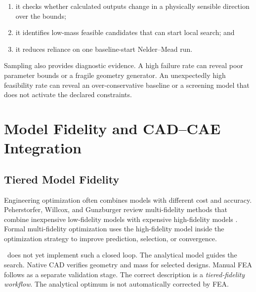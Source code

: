 \begin{enumerate}
    \item it checks whether calculated outputs change in a physically sensible
    direction over the bounds;
    \item it identifies low-mass feasible candidates that can start local
    search; and
    \item it reduces reliance on one baseline-start Nelder--Mead run.
\end{enumerate}

Sampling also provides diagnostic evidence. A high failure rate can reveal
poor parameter bounds or a fragile geometry generator. An unexpectedly high
feasibility rate can reveal an over-conservative baseline or a screening model
that does not activate the declared constraints.

\section{Model Fidelity and CAD--CAE Integration}
\label{sec:model-fidelity-integration}

\subsection{Tiered Model Fidelity}
\label{sec:fidelity-review}

Engineering optimization often combines models with different cost and
accuracy. Peherstorfer, Willcox, and Gunzburger review multi-fidelity methods
that combine inexpensive low-fidelity models with expensive high-fidelity
models \cite{peherstorfer2018}. Formal multi-fidelity optimization uses the
high-fidelity model inside the optimization strategy to improve prediction,
selection, or convergence.

\NEMO\ does not yet implement such a closed loop. The analytical model guides
the search. Native CAD verifies geometry and mass for selected designs. Manual
FEA follows as a separate validation stage. The correct description is a
\emph{tiered-fidelity workflow}. The analytical optimum is not automatically
corrected by FEA.

